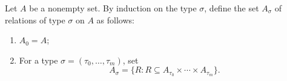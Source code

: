 Let $A$ be a nonempty set. By induction on the type $\sigma$, define the set $A_\sigma$ of relations of type $\sigma$ on $A$ as follows:

\begin{enumerate}
\item[(13)] $A_0 = A$;
\item[(14)] For a type $\sigma = (\tau_0, \ldots, \tau_m)$, set
  $$A_\sigma = \{R : R \subseteq A_{\tau_0} \times \cdots \times A_{\tau_m}\}.$$
\end{enumerate}

